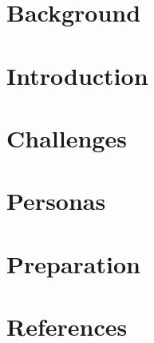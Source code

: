 \section[Back]{Background}


\section[Intro]{Introduction}


\section[Challenges]{Challenges}


\section[Personas]{Personas}
% 


\section[Prep]{Preparation}


% 

\section[Refs]{References}
